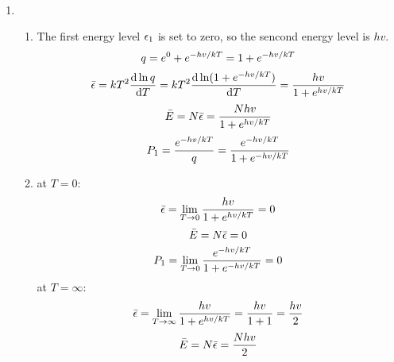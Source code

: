 \begin{solution}\
    \begin{enumerate}
        \item \begin{enumerate}
                  \item The first energy level $\epsilon_1$ is set to zero, so the sencond energy level is $hv$.
                        \begin{equation*}
                            q=e^0+e^{-hv/kT}=1+e^{-hv/kT}
                        \end{equation*}
                        \begin{equation*}
                            \bar{\epsilon}=kT^2\frac{\mathrm{d}\ln q}{\mathrm{d} T}=kT^2\frac{\mathrm{d}\ln(1+e^{-hv/kT})}{\mathrm{d} T}=\frac{hv}{1+e^{hv/kT}}
                        \end{equation*}
                        \begin{equation*}
                            \bar{E}=N\bar{\epsilon}=\frac{Nhv}{1+e^{hv/kT}}
                        \end{equation*}
                        \begin{equation*}
                            P_1=\frac{e^{-hv/kT}}{q}=\frac{e^{-hv/kT}}{1+e^{-hv/kT}}
                        \end{equation*}
                  \item at $T=0$:
                        \begin{equation*}
                            \bar{\epsilon}=\lim_{T \to 0}\frac{hv}{1+e^{hv/kT}}=0
                        \end{equation*}
                        \begin{equation*}
                            \bar{E}=N\bar{\epsilon}=0
                        \end{equation*}
                        \begin{equation*}
                            P_1=\lim_{T\to 0}\frac{e^{-hv/kT}}{1+e^{-hv/kT}}=0
                        \end{equation*}
                        at $T=\infty$:
                        \begin{equation*}
                            \bar{\epsilon}=\lim_{T\to\infty}\frac{hv}{1+e^{hv/kT}}=\frac{hv}{1+1}=\frac{hv}{2}
                        \end{equation*}
                        \begin{equation*}
                            \bar{E}=N\bar{\epsilon}=\frac{Nhv}{2}
                        \end{equation*}

\end{enumerate}
\end{enumerate}
\end{solution}
